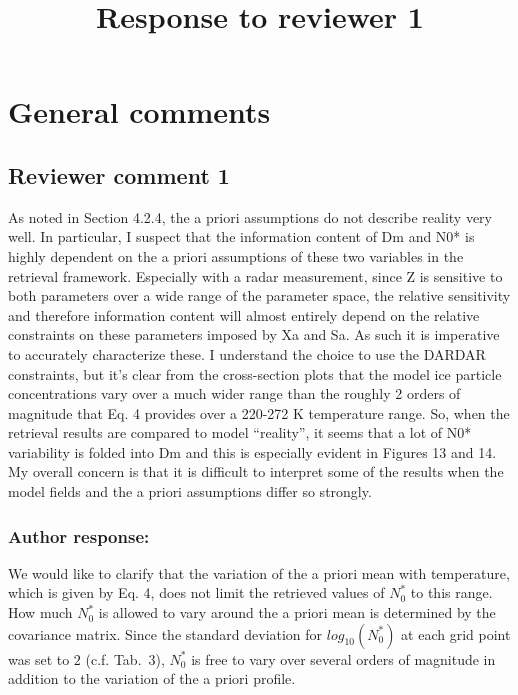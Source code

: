 \documentclass[11pt]{scrartcl}
\title{Response to reviewer 1}
\date{}
\begin{document}
\maketitle

\setlength{\parindent}{0cm}

\section{General comments}

\subsection*{Reviewer comment 1}

As noted in Section 4.2.4, the a priori assumptions do not describe reality very
well. In particular, I suspect that the information content of Dm and N0* is
highly dependent on the a priori assumptions of these two variables in the
retrieval framework. Especially with a radar measurement, since Z is sensitive
to both parameters over a wide range of the parameter space, the relative
sensitivity and therefore information content will almost entirely depend on the
relative constraints on these parameters imposed by Xa and Sa. As such it is
imperative to accurately characterize these. I understand the choice to use the
DARDAR constraints, but it’s clear from the cross-section plots that the model
ice particle concentrations vary over a much wider range than the roughly 2
orders of magnitude that Eq. 4 provides over a 220-272 K temperature range. So,
when the retrieval results are compared to model “reality”, it seems that a lot
of N0* variability is folded into Dm and this is especially evident in Figures
13 and 14. My overall concern is that it is difficult to interpret some of the
results when the model fields and the a priori assumptions differ so strongly.

\subsubsection*{Author response:}

We would like to clarify that the variation of the a priori mean with
temperature, which is given by Eq. 4, does not limit the retrieved values of
$N_0^*$ to this range. How much $N_0^*$ is allowed to vary around the a priori
mean is determined by the covariance matrix. Since the standard deviation for
$log_{10}(N_0^*)$ at each grid point was set to $2$ (c.f. Tab.~3), $N_0^*$ is
free to vary over several orders of magnitude in addition to the variation of
the a priori profile.
\end{document}

